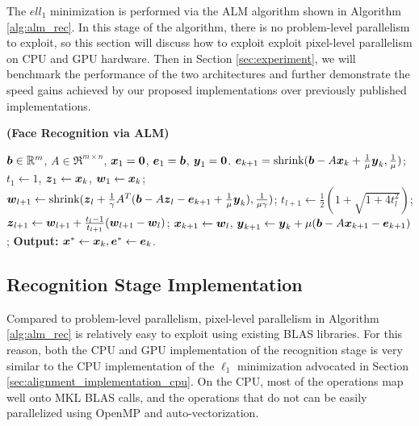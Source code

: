 \documentclass[10pt,twocolumn,letterpaper]{article}
\begin{document}
The $ell_1$ minimization is performed via the ALM algorithm shown in 
Algorithm \ref{alg:alm_rec}.  In this stage of the algorithm, there is no problem-level
parallelism to exploit, so this section will discuss how to exploit exploit pixel-level parallelism
on CPU and GPU hardware.
Then in Section \ref{sec:experiment}, we will benchmark the
performance of the two architectures and further demonstrate the speed
gains achieved by our proposed implementations over previously published implementations.

\begin{algorithm}[t]
\caption{\bf (Face Recognition via ALM)} \label{alg:alm_rec} 
\begin{algorithmic}[1]
\begin{small}
 ${\boldsymbol{b}} \in {\mathbb{R}}^m$, $A \in \Re^{m \times n}$,
${\boldsymbol{x}}_1 = \boldsymbol{0}$, $\boldsymbol{e}_1 = {\boldsymbol{b}}$, $\boldsymbol{y}_1 =
\boldsymbol{0}$.
\STATE $\boldsymbol{e}_{k+1} = \textup{shrink}({\boldsymbol{b}} - A{\boldsymbol{x}}_k +
\frac{1}{\mu}\boldsymbol{y}_k, \frac{1}{\mu})$;
\STATE $t_1\leftarrow 1$, $\boldsymbol{z}_1 \leftarrow {\boldsymbol{x}}_k$, $\boldsymbol{w}_1 \leftarrow {\boldsymbol{x}}_k$;
\STATE $\boldsymbol{w}_{l+1} \leftarrow \textup{shrink}(\boldsymbol{z}_l +
\frac{1}{\gamma}A^T({\boldsymbol{b}} - A\boldsymbol{z}_l - \boldsymbol{e}_{k+1} +
\frac{1}{\mu}\boldsymbol{y}_k), \frac{1}{\mu\gamma})$;
\STATE $t_{l+1} \leftarrow \frac{1}{2}( 1 +
\sqrt{1+4t_l^2})$;
\STATE $\boldsymbol{z}_{l+1} \leftarrow \boldsymbol{w}_{l+1} + \frac{t_l - 1}{t_{l+1}}(\boldsymbol{w}_{l+1} - \boldsymbol{w}_l)$;
\ENDWHILE
\STATE ${\boldsymbol{x}}_{k+1} \leftarrow \boldsymbol{w}_{l}$,  \; $\boldsymbol{y}_{k+1} \leftarrow \boldsymbol{y}_k + \mu ({\boldsymbol{b}} - A{\boldsymbol{x}}_{k+1} - \boldsymbol{e}_{k+1})$;
\ENDWHILE \STATE
{\bf Output:} ${\boldsymbol{x}}^* \leftarrow {\boldsymbol{x}}_k, \boldsymbol{e}^* \leftarrow \boldsymbol{e}_k$.
\end{small}
\end{algorithmic}
\end{algorithm}

\subsection{Recognition Stage Implementation} Compared to problem-level
parallelism, pixel-level parallelism in Algorithm \ref{alg:alm_rec} is
relatively easy to exploit using existing BLAS libraries.  For this reason,
both the CPU and GPU implementation of the recognition stage is very similar to
the CPU implementation of the $\ell_1$ minimization advocated in Section
\ref{sec:alignment_implementation_cpu}.  On the CPU, most of the operations map
well onto MKL BLAS calls, and the operations that do not can be easily
parallelized using OpenMP and auto-vectorization.
\end{document}
